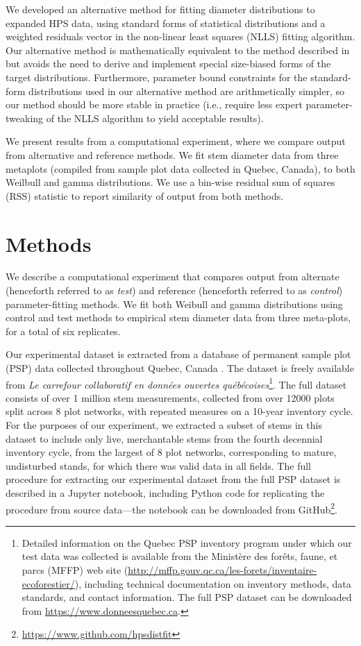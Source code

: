 \message{ !name(hpsdistfit_article.tex)}\documentclass{article}
\begin{document}
We developed an alternative method for fitting diameter distributions
to expanded HPS data, using standard forms of statistical
distributions and a weighted residuals vector in the non-linear
least squares (NLLS) fitting algorithm.
Our alternative method is mathematically equivalent to the method
described in \citet{ducey2015sizebiased} but avoids the need to
derive and implement special size-biased forms of the target
distributions.
Furthermore, parameter bound constraints for the standard-form
distributions used in our alternative method are arithmetically
simpler, so our method should be more stable in practice (i.e., require less expert parameter-tweaking
of the NLLS algorithm to yield acceptable results).

We present results from a computational experiment, where we compare
output from alternative and reference methods.
We fit stem diameter data from three metaplots (compiled from sample plot
data collected in Quebec, Canada), to both Weilbull and gamma
distributions. We use a bin-wise residual sum of squares (RSS)
statistic to report similarity of output from both methods.

\section{Methods}
\label{sec:methods}

We describe a computational experiment that compares output from
alternate (henceforth referred to as \emph{test}) and reference
(henceforth referred to as \emph{control}) parameter-fitting methods. 
We fit both Weibull and gamma distributions using control
and test methods to empirical stem
diameter data from three meta-plots, for a total of six replicates.

Our experimental dataset is extracted from a database of permanent sample plot (PSP) data
collected throughout Quebec, Canada \citep{quebec2018pep}.
The dataset is freely available from \emph{Le carrefour
  collaboratif en données ouvertes québécoises}\footnote{Detailed
  information on the Quebec
  PSP inventory program under which our test data was collected is
  available from the Ministère des forêts, faune, et parcs (MFFP) web site
  (\url{http://mffp.gouv.qc.ca/les-forets/inventaire-ecoforestier/}), including
  technical documentation on inventory methods, data standards, and
  contact information. The full PSP dataset can be downloaded from \url{https://www.donneesquebec.ca}.}.
The full dataset consists of over 1 million stem measurements,
collected from over 12000 plots split across 8 plot networks, with
repeated measures on a 10-year inventory cycle.
For the purposes of our experiment, we extracted a subset of stems in this dataset to
include only live, merchantable stems from the fourth decennial inventory
cycle, from the largest of 8 plot networks, corresponding to mature, undisturbed stands, for which there was valid
data in all fields.
The full procedure for extracting our experimental dataset from the
full PSP dataset is described in a Jupyter notebook, including Python
code for replicating the procedure from
source data---the notebook can be downloaded from GitHub\footnote{\url{https://www.github.com/hpsdistfit}}.
\end{document}
